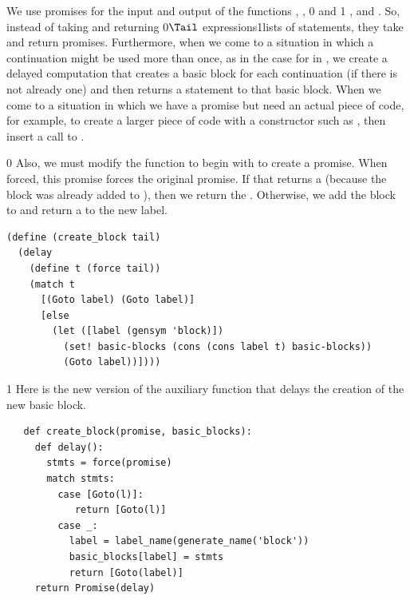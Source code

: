 \documentclass[7x10]{TimesAPriori_MIT}%
\def\racketEd{0}
\def\pythonEd{1}
\def\edition{1}
\newcommand{\racket}[1]{{\if\edition\racketEd{#1}\fi}}
\newcommand{\pythonColor}[0]{}
\newcommand{\python}[1]{{\if\edition\pythonEd\pythonColor #1\fi}}
\numberwithin{theorem}{chapter}
\numberwithin{definition}{chapter}
\numberwithin{equation}{chapter}
\begin{document}
We use promises for the input and output of the functions
, ,
%
\racket{ and }\python{ , and }.
%
So, instead of taking and returning \racket{$\Tail$
  expressions}\python{lists of statements}, they take and return
promises. Furthermore, when we come to a situation in which a
continuation might be used more than once, as in the case for
 in , we create a delayed computation
that creates a basic block for each continuation (if there is not
already one) and then returns a  statement to that basic
block. When we come to a situation in which we have a promise but need an
actual piece of code, for example, to create a larger piece of code with a
constructor such as , then insert a call to .
%
{\if\edition\racketEd
%
Also, we must modify the  function to begin with
 to create a promise. When forced, this promise forces the
original promise. If that returns a  (because the block was
already added to ), then we return the
. Otherwise, we add the block to  and
return a  to the new label.
\begin{center}
\begin{minipage}{\textwidth}
\begin{lstlisting}
(define (create_block tail)
  (delay
    (define t (force tail))
    (match t
      [(Goto label) (Goto label)]
      [else
        (let ([label (gensym 'block)])
          (set! basic-blocks (cons (cons label t) basic-blocks))
          (Goto label))])))
\end{lstlisting}
\end{minipage}
\end{center}
\fi}

{\if\edition\pythonEd\pythonColor
%
Here is the new version of the  auxiliary function
that delays the creation of the new basic block.\\
\begin{minipage}{\textwidth}
\begin{lstlisting}
   def create_block(promise, basic_blocks):
     def delay():
       stmts = force(promise)
       match stmts:
         case [Goto(l)]:
            return [Goto(l)]
         case _:
           label = label_name(generate_name('block'))
           basic_blocks[label] = stmts
           return [Goto(label)]
     return Promise(delay)
\end{lstlisting}
\end{minipage}

\fi}
\end{document}
